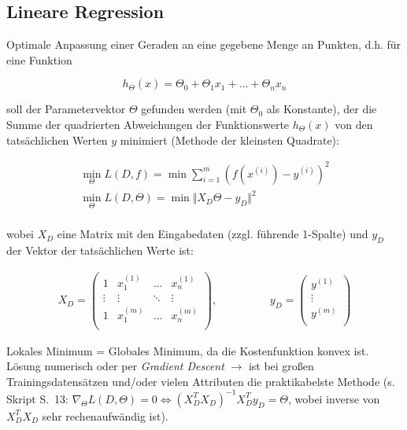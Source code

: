 \subsection{Lineare Regression}
\label{linearRegression}
Optimale Anpassung einer Geraden an eine gegebene Menge an Punkten, d.h. für eine Funktion

\begin{equation*}
    h_{\Theta}(x) = \Theta_0 + \Theta_1x_1 + \dots + \Theta_nx_n
\end{equation*}

soll der Parametervektor $\Theta$ gefunden werden (mit $\Theta_0$ als Konstante), der die Summe der quadrierten Abweichungen der Funktionswerte $h_{\Theta}(x)$ von den tatsächlichen Werten $y$ minimiert (Methode der kleinsten Quadrate):

\begin{equation*}
    \begin{split}
        \underset{\Theta}{\min} L(D, f) = \min \sum_{i=1}^{m}(f(x^{(i)}) - y^{(i)})^2\\
        \underset{\Theta}{\min} L(D, \Theta) = \min \Vert X_D\Theta-y_D\Vert^2\\
    \end{split}
\end{equation*}

wobei $X_D$ eine Matrix mit den Eingabedaten (zzgl. führende 1-Spalte) und $y_D$ der Vektor der tatsächlichen Werte ist:

\begin{equation*}
    \begin{split}
        X_D=
        \begin{pmatrix}
            1 & x_1^{(1)} & \dots & x_n^{(1)}\\
            \vdots & \vdots & \ddots & \vdots\\
            1 & x_1^{(m)} & \dots & x_n^{(m)}\\
        \end{pmatrix},\hspace{2cm}
        y_D=
        \begin{pmatrix}
            y^{(1)}\\
            \vdots\\
            y^{(m)}\\
        \end{pmatrix}
    \end{split}
\end{equation*}

Lokales Minimum = Globales Minimum, da die Kostenfunktion konvex ist. Lösung numerisch oder per \emph{Gradient Descent} $\rightarrow$ ist bei großen Trainingsdatensätzen und/oder vielen Attributen die praktikabelste Methode (s. Skript S.~13: $\nabla_\Theta L(D,\Theta)=0 \Leftrightarrow (X_D^TX_D)^{-1}X_D^Ty_D=\Theta$, wobei inverse von $X_D^TX_D$ sehr rechenaufwändig ist).\\

